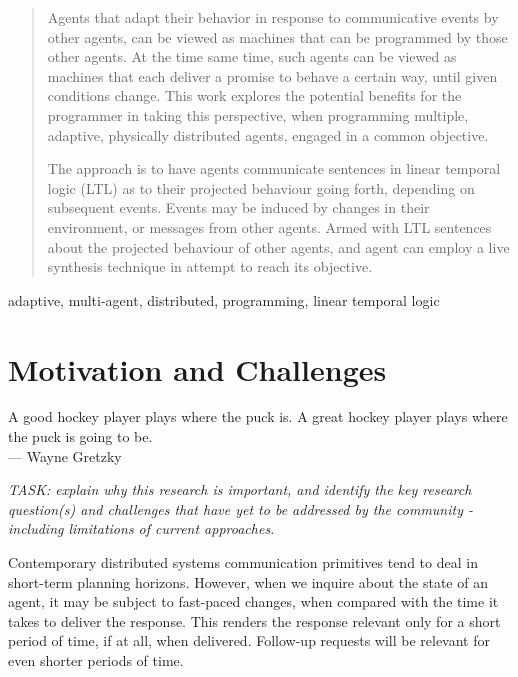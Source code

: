 \documentclass[conference]{IEEEtran}
\begin{document}
\begin{abstract}


Agents that adapt their behavior in response to communicative events
by other agents, can be viewed as machines that can be programmed by
those other agents. At the time same time, such agents can be viewed
as machines that each deliver a promise to behave a certain way, until
given conditions change. This work explores the potential benefits for
the programmer in taking this perspective, when programming multiple,
adaptive, physically distributed agents, engaged in a common
objective.

The approach is to have agents communicate sentences in linear
temporal logic (LTL) as to their projected behaviour going forth,
depending on subsequent events. Events may be induced by changes in
their environment, or messages from other agents. Armed with LTL
sentences about the projected behaviour of other agents, and agent can
employ a live synthesis technique in attempt to reach its objective.

\end{abstract}

\begin{IEEEkeywords}
adaptive, multi-agent, distributed, programming, linear temporal logic
\end{IEEEkeywords}

\section{Motivation and Challenges}

\begin{flushright}
A good hockey player plays where the puck is. A great
hockey player plays where the puck is going to be.\\
--- {\sc Wayne Gretzky}
\end{flushright}

\emph{TASK: explain why this research is important, and identify the
key research question(s) and challenges that have yet to be addressed
by the community - including limitations of current approaches.}

Contemporary distributed systems communication primitives tend to deal
in short-term planning horizons. However, when we inquire about the
state of an agent, it may be subject to fast-paced changes, when
compared with the time it takes to deliver the response. This renders
the response relevant only for a short period of time, if at all, when
delivered.  Follow-up requests will be relevant for even shorter
periods of time.
\end{document}
